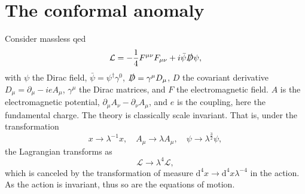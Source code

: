 \section{The conformal anomaly}
Consider massless \gls{qed}
\begin{equation}
  \mathcal{L} = -\frac{1}{4} F^{\mu\nu}F_{\mu\nu} + i \bar{\psi} \slashed{D} \psi,
\end{equation}
with $\psi$ the Dirac field, $\bar{\psi} = \psi^{\dagger}\gamma^0$, $\slashed{D} = \gamma^{\mu} D_{\mu}$, $D$ the covariant derivative $D_{\mu} = \partial_{\mu}-ieA_{\mu}$, $\gamma^{\mu}$ the Dirac matrices, and $F$ the electromagnetic field.
$A$ is the electromagnetic potential, $\partial _{\mu }A_{\nu } - \partial _{\nu } A_{\mu }$, and $e$ is the coupling, here the fundamental charge.
The theory is classically scale invariant.
That is, under the transformation
\begin{equation}
  x \to \lambda^{-1} x, \quad A_{\mu} \to  \lambda A_{\mu}, \quad \psi \to  \lambda^{\frac{3}{2}}\psi,
\end{equation}
the Lagrangian transforms as
\begin{equation}
  \mathcal{L} \to \lambda^4 \mathcal{L},
\end{equation}
which is canceled by the transformation of measure $\mathrm{d}^4 x \to \mathrm{d}^4x \lambda ^{-4}$ in the action.
As the action is invariant, thus so are the equations of motion.

